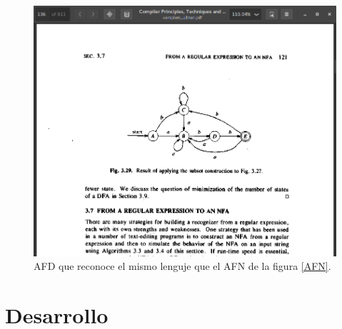 \documentclass[titlepage]{article}
\begin{document}
\begin{figure}[H]
        \begin{center}
        \includegraphics[width=\textwidth]{AFD.png}
        \caption{AFD que reconoce el mismo lenguje que el AFN de la figura \ref{AFN}.}
        \label{fig:AFD}
        \end{center}
    \end{figure}

\section{Desarrollo}
\end{document}
